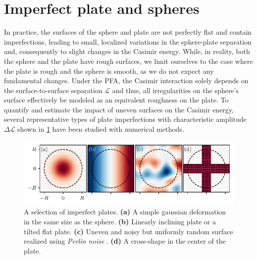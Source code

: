 \section{Imperfect plate and spheres}
\label{sec:3:imperfect-plates}

In practice, the surfaces of the sphere and plate are not perfectly flat and contain imperfections, leading to small, localized variations in the sphere-plate separation and, consequently to slight changes in the Casimir energy. 
While, in reality, both the sphere and the plate have rough surfaces, we limit ourselves to the case where the plate is rough and the sphere is smooth, as we do not expect any fundamental changes.
Under the PFA, the Casimir interaction solely depends on the surface-to-surface separation $\mathscr{L}$ and thus, all irregularities on the sphere's surface effectively be modeled as an equivalent roughness on the plate.
To quantify and estimate the impact of uneven surfaces on the Casimir energy, several representative types of plate imperfections with characteristic amplitude $\Delta \mathscr{L}$ shown in \cref{fig:3:imperfect-plates} have been studied with numerical methods.
\begin{figure}[!htbp]
  \centering
  \includegraphics[width=\textwidth]{../figures/casimir/imperfect-plates-advanced.pdf}
  \caption{A selection of imperfect plates. \textbf{(a)} A simple gaussian deformation in the same size as the sphere. \textbf{(b)} Linearly inclining plate or a tilted flat plate. \textbf{(c)} Uneven and noisy but uniformly random surface realized using \textit{Perlin noise} \cite{Perlin_1985}. \textbf{(d)} A cross-shape in the center of the plate.}
  \label{fig:3:imperfect-plates}
\end{figure}
